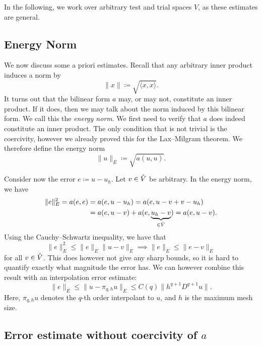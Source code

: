 In the following, we work over arbitrary test and trial spaces \( V \), as
these estimates are general.

\subsection{Energy Norm}
We now discuss some a priori estimates. Recall that any arbitrary inner product
induces a norm by
\begin{equation}
    \| x \| \coloneqq \sqrt{ \langle x, x \rangle }.
\end{equation}
It turns out that the bilinear form \( a \) may, or may not, constitute an
inner product. If it does, then we may talk about the norm induced by this
bilinear form.  We call this the \emph{energy norm}. We first need to verify
that \( a \) does indeed constitute an inner product. The only condition that
is not trivial is the coercivity, however we already proved this for the
Lax--Milgram theorem. We therefore define the energy norm
\begin{equation}
    \|u\|_E \coloneqq \sqrt{a(u, u)}.
\end{equation}

Consider now the error \( e \coloneqq u - u_h \). Let \(v \in \hat{V}\) be
arbitrary. In the energy norm, we have
\begin{align}
    \| e \|_E^2 = a(e, e) &= a(e, u - u_h) = a(e, u - v + v - u_h) \\
                          &= a(e, u - v) + a(e, \underbrace{u_h - v}_{\in \hat{V}}) = a(e, u-v).
\end{align}
Using the Cauchy--Schwartz inequality, we have that
\begin{equation}
     \| e \|_E^2 \leq \|e\|_E \|u - v\|_E \implies \| e \|_E \leq \|e - v\|_E
\end{equation}
for all \( v \in \hat{V} \). This does however not give any sharp bounds, so it
is hard to quantify exactly what magnitude the error has. We can however
combine this result with an interpolation error estimate:
\begin{equation}
    \| e \|_E \leq \| u - \pi_{q, h} u\|_E \leq C(q) \| h^{q + 1}
    D^{q+1} u\|.
\end{equation}
Here, \( \pi_{q, h} u\) denotes the \( q \)-th order interpolant to \( u \),
and \( h \) is the maximum mesh size.


\subsection{Error estimate without coercivity of \(a\)}

